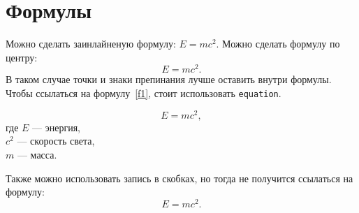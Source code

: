 \section{Формулы}

Можно сделать заинлайненую формулу: $E = mc^2$. Можно сделать формулу по центру: $$E = mc^2.$$ В таком случае точки и знаки препинания лучше оставить внутри формулы. Чтобы ссылаться на формулу~\ref{f1}, стоит использовать \texttt{equation}.

\begin{equation}\label{f1}
    E = mc^2,
\end{equation}
где $E$ --- энергия, \\ $c^2$ --- скорость света, \\ $m$ --- масса. 

Также можно использовать запись в скобках, но тогда не получится ссылаться на формулу:
\[
    E = mc^2.
\]

